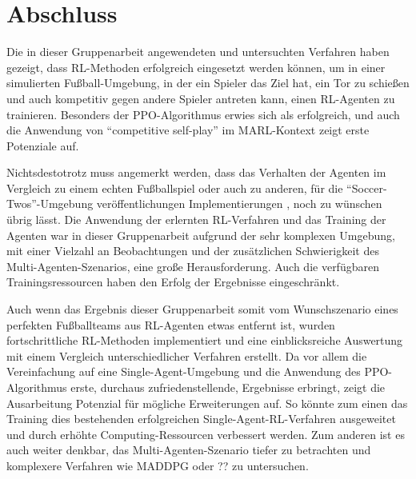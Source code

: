 \chapter{Abschluss} \label{chapter:4}

Die in dieser Gruppenarbeit angewendeten und untersuchten Verfahren haben gezeigt, dass \ac{RL}-Methoden erfolgreich eingesetzt werden können, um in einer simulierten Fußball-Umgebung, in der ein Spieler das Ziel hat, ein Tor zu schießen und auch kompetitiv gegen andere Spieler antreten kann, einen \ac{RL}-Agenten zu trainieren. Besonders der \ac{PPO}-Algorithmus erwies sich als erfolgreich, und auch die Anwendung von ``competitive self-play'' im \ac{MARL}-Kontext zeigt erste Potenziale auf.

Nichtsdestotrotz muss angemerkt werden, dass das Verhalten der Agenten im Vergleich zu einem echten Fußballspiel oder auch zu anderen, für die ``Soccer-Twos''-Umgebung veröffentlichungen Implementierungen \cite{todo}, noch zu wünschen übrig lässt. Die Anwendung der erlernten \ac{RL}-Verfahren und das Training der Agenten war in dieser Gruppenarbeit aufgrund der sehr komplexen Umgebung, mit einer Vielzahl an Beobachtungen und der zusätzlichen Schwierigkeit des Multi-Agenten-Szenarios, eine große Herausforderung. Auch die verfügbaren Trainingsressourcen haben den Erfolg der Ergebnisse eingeschränkt.

Auch wenn das Ergebnis dieser Gruppenarbeit somit vom Wunschszenario eines perfekten Fußballteams aus \ac{RL}-Agenten etwas entfernt ist, wurden fortschrittliche \ac{RL}-Methoden implementiert und eine einblicksreiche Auswertung mit einem Vergleich unterschiedlicher Verfahren erstellt. Da vor allem die Vereinfachung auf eine Single-Agent-Umgebung und die Anwendung des \ac{PPO}-Algorithmus erste, durchaus zufriedenstellende, Ergebnisse erbringt, zeigt die Ausarbeitung Potenzial für mögliche Erweiterungen auf. So könnte zum einen das Training dies bestehenden erfolgreichen Single-Agent-RL-Verfahren ausgeweitet und durch erhöhte Computing-Ressourcen verbessert werden. Zum anderen ist es auch weiter denkbar, das Multi-Agenten-Szenario tiefer zu betrachten und komplexere Verfahren wie MADDPG oder ?? zu untersuchen.